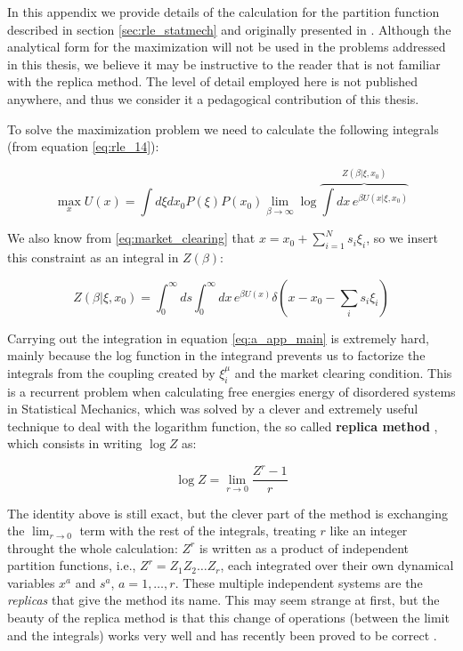 In this appendix we provide details of the calculation for the partition function described in section \ref{sec:rle_statmech} and originally presented in \cite{DeMartinoMarsili04}. Although the analytical form for the maximization will not be used in the problems addressed in this thesis, we believe it may be instructive to the reader that is not familiar with the replica method. The level of detail employed here is not published anywhere, and thus we consider it a pedagogical contribution of this thesis.

To solve the maximization problem we need to calculate the following integrals (from equation \eqref{eq:rle_14}):

\begin{equation}
    \label{eq:a_app_main}
    \max_x U(x) = \int d\xi dx_0 P(\xi) P(x_0)  \lim_{\beta\to\infty} \log \overbrace{\int dx\, e^{\beta U(x| \xi, x_0)}}^{Z(\beta | \xi, x_0)}
\end{equation}

We also know from \eqref{eq:market_clearing} that $x = x_0 +
\sum_{i=1}^N s_i \xi_i$, so we insert this constraint as an integral in $Z(\beta)$:

\begin{equation}
    \label{eq:a_appZ}
    Z(\beta | \xi, x_0) = \int_0^\infty ds \int_0^\infty dx\, e^{\beta U(x)} \delta\left(x - x_0 - \sum_i s_i \xi_i \right)
\end{equation}

Carrying out the integration in equation \eqref{eq:a_app_main} is
extremely hard, mainly because the log function in the integrand
prevents us to factorize the integrals from the coupling created by
$\xi_i^\mu$ and the market clearing condition. This is a recurrent
problem when calculating free energies energy of disordered systems in Statistical Mechanics, which was solved by a clever and extremely
useful technique to deal with the logarithm function, the so called
\textbf{replica method} \cite{NishimoriBook}, which consists in
writing $\log Z$ as:

\begin{equation}
    \label{eq:a_replica_trick}
    \log Z = \lim_{r\to 0} \frac{Z^r - 1}{r}
\end{equation}

The identity above is still exact, but the clever part of the method
is exchanging the $\lim_{r\to 0}$ term with the rest of the
integrals, treating $r$ like an integer throught the whole
calculation: $Z^r$ is written as a product of independent partition
functions, i.e., $Z^r = Z_1 Z_2 \ldots Z_r$, each integrated over their
own dynamical variables $x^a$ and $s^a$, $a = 1, \ldots, r$. These
multiple independent systems are the \emph{replicas} that give the
method its name. This may seem strange at first, but the beauty of the
replica method is that this change of operations (between the limit
and the integrals) works very well and has recently been proved to be correct \cite{talagrand2003}.

